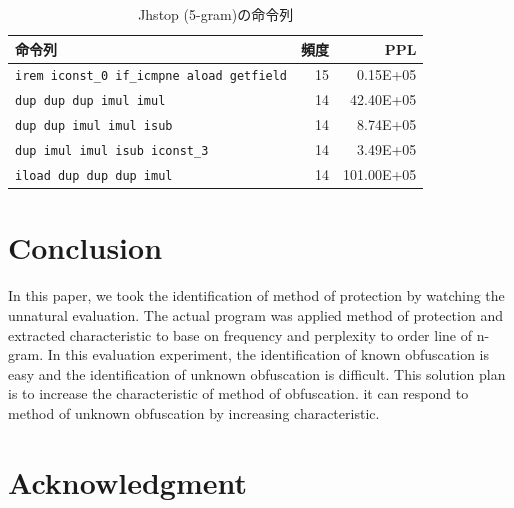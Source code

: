 \documentclass[conference]{IEEEtran}
\begin{document}
\begin{table}[t]
  \centering
  \footnotesize{
    \caption{Jhstop (5-gram)の命令列}\label{table:jhstop}
  \begin{tabular}{l|r|r}
   命令列 & 頻度 & PPL\\ \hline
    \texttt{irem iconst\_0 if\_icmpne aload getfield} & 15 &   0.15E+05 \\
    \texttt{dup dup dup imul imul}                    & 14 &  42.40E+05 \\
    \texttt{dup dup imul imul isub}                   & 14 &   8.74E+05 \\
    \texttt{dup imul imul isub iconst\_3}             & 14 &   3.49E+05 \\
    \texttt{iload dup dup dup imul}                   & 14 & 101.00E+05 \\
    \end{tabular}}
\end{table}


\section{Conclusion}
In this paper, we took the identification of method of protection by watching the unnatural evaluation.
The actual program was applied method of protection and extracted characteristic to base on frequency and perplexity to order line of n-gram.
In this evaluation experiment, the identification of known obfuscation is easy and the identification of unknown obfuscation is difficult.
This solution plan is to increase the characteristic of method of obfuscation.
it can respond to method of unknown obfuscation by increasing characteristic. 




\section*{Acknowledgment}


\end{document}
